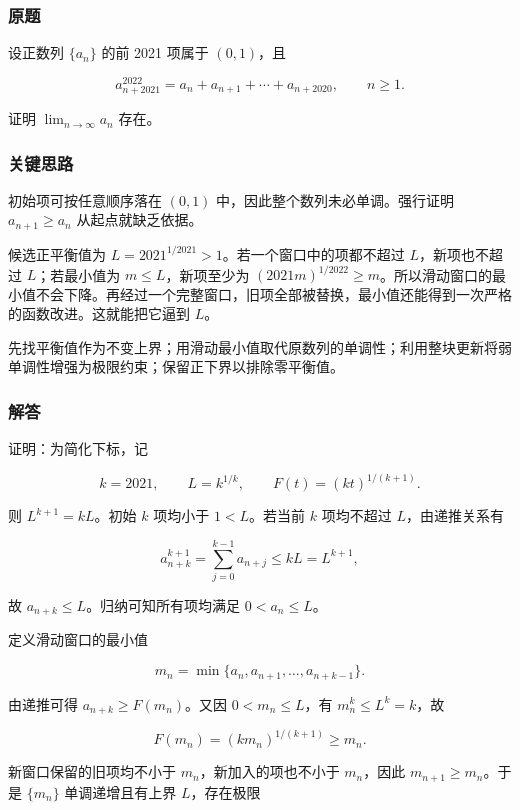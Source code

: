 \documentclass[11pt,a4paper]{article}
\begin{document}
\subsubsection{原题}\label{ux539fux9898-18}

设正数列 \(\{a_n\}\) 的前 2021 项属于 \((0,1)\)，且

\[
a_{n+2021}^{2022}=a_n+a_{n+1}+\cdots+a_{n+2020},\qquad n\ge1.
\]

证明 \(\lim_{n\to\infty}a_n\) 存在。

\subsubsection{关键思路}\label{ux5173ux952eux601dux8def-18}

初始项可按任意顺序落在 \((0,1)\) 中，因此整个数列未必单调。强行证明
\(a_{n+1}\ge a_n\) 从起点就缺乏依据。

候选正平衡值为 \(L=2021^{1/2021}>1\)。若一个窗口中的项都不超过
\(L\)，新项也不超过 \(L\)；若最小值为 \(m\le L\)，新项至少为
\((2021m)^{1/2022}\ge m\)。所以滑动窗口的最小值不会下降。再经过一个完整窗口，旧项全部被替换，最小值还能得到一次严格的函数改进。这就能把它逼到
\(L\)。

先找平衡值作为不变上界；用滑动最小值取代原数列的单调性；利用整块更新将弱单调性增强为极限约束；保留正下界以排除零平衡值。

\subsubsection{解答}\label{ux89e3ux7b54-18}

证明：为简化下标，记

\[
k=2021,\qquad L=k^{1/k},\qquad F(t)=(kt)^{1/(k+1)}.
\]

则 \(L^{k+1}=kL\)。初始 \(k\) 项均小于 \(1<L\)。若当前 \(k\) 项均不超过
\(L\)，由递推关系有

\[
a_{n+k}^{k+1}=\sum_{j=0}^{k-1}a_{n+j}\le kL=L^{k+1},
\]

故 \(a_{n+k}\le L\)。归纳可知所有项均满足 \(0<a_n\le L\)。

定义滑动窗口的最小值

\[
m_n=\min\{a_n,a_{n+1},\ldots,a_{n+k-1}\}.
\]

由递推可得 \(a_{n+k}\ge F(m_n)\)。又因 \(0<m_n\le L\)，有
\(m_n^k\le L^k=k\)，故

\[
F(m_n)=(km_n)^{1/(k+1)}\ge m_n.
\]

新窗口保留的旧项均不小于 \(m_n\)，新加入的项也不小于 \(m_n\)，因此
\(m_{n+1}\ge m_n\)。于是 \(\{m_n\}\) 单调递增且有上界 \(L\)，存在极限
\end{document}
